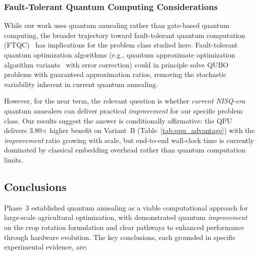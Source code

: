 \subsubsection{Fault-Tolerant Quantum Computing Considerations}

While our work uses quantum annealing rather than gate-based quantum computing, the broader trajectory toward fault-tolerant quantum computation (FTQC)~\cite{campbell2017roads} has implications for the problem class studied here. Fault-tolerant quantum optimization algorithms (e.g., quantum approximate optimization algorithm variants~\cite{edwardfarhiQuantumApproximateOptimization2014} with error correction) could in principle solve QUBO problems with guaranteed approximation ratios, removing the stochastic variability inherent in current quantum annealing.

However, for the near term, the relevant question is whether \textit{current NISQ-era} quantum annealers can deliver practical \textit{improvement} for our specific problem class. Our results suggest the answer is conditionally affirmative: the QPU delivers 3.80$\times$ higher benefit on Variant~B (Table~\ref{tab:qpu_advantage}) with the \textit{improvement} ratio growing with scale, but end-to-end wall-clock time is currently dominated by classical embedding overhead rather than quantum computation limits.

\subsection{Conclusions}

Phase~3 established quantum annealing as a viable computational approach for large-scale agricultural optimization, with demonstrated quantum \textit{improvement} on the crop rotation formulation and clear pathways to enhanced performance through hardware evolution. The key conclusions, each grounded in specific experimental evidence, are:

